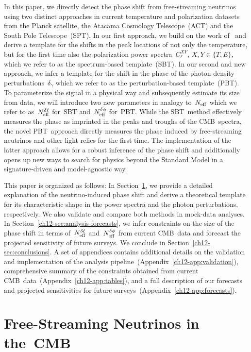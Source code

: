 In this paper, we directly detect the phase shift from free-streaming neutrinos using two distinct approaches in current temperature and polarization datasets from the Planck satellite, the Atacama Cosmology Telescope~(ACT) and the South Pole Telescope~(SPT). In our first approach, we build on the work of~\cite{Follin:2015hya} and derive a template for the shifts in the peak locations of not only the temperature, but for the first time also the polarization power spectra~$C_\ell^{XY}$\hskip-2pt, $X,Y \in \{T, E\}$, which we refer to as the spectrum-based template~(SBT). In our second and new approach, we infer a template for the shift in the phase of the photon density perturbations~$\delta_\gamma$ which we refer to as the perturbation-based template~(PBT). To parameterize the signal in a physical way and subsequently estimate its size from data, we will introduce two new parameters in analogy to~$N_\mathrm{eff}$ which we refer to as~$N_\mathrm{eff}^{\delta\ell}$ for~SBT and~$N_\mathrm{eff}^{\delta\phi}$ for~PBT. While the SBT~method effectively measures the phase as imprinted in the peaks and troughs of the CMB~spectra, the novel PBT~approach directly measures the phase induced by free-streaming neutrinos and other light relics for the first time. The implementation of the latter approach allows for a robust inference of the phase shift and additionally opens up new ways to search for physics beyond the Standard Model in a signature-driven and model-agnostic way.\bigskip

This paper is organized as follows: In Section~\ref{ch12-sec:background}, we provide a detailed explanation of the neutrino-induced phase shift and derive a theoretical template for its characteristic shape in the power spectra and the photon perturbations, respectively. We also validate and compare both methods in mock-data analyses. In Section~\ref{ch12-sec:analysis-forecasts}, we infer constraints on the size of the phase shift in terms of~$N_\mathrm{eff}^{\delta\ell}$ and~$N_\mathrm{eff}^{\delta\phi}$ from current CMB~data and forecast the projected sensitivity of future surveys. We conclude in Section~\ref{ch12-sec:conclusions}. A set of appendices contains additional details on the validation and implementation of the analysis pipeline~(Appendix~\ref{ch12-app:validation}), comprehensive summary of the constraints obtained from current CMB~data~(Appendix~\ref{ch12-app:tables}), and a full description of our forecasts and projected sensitivities for future surveys~(Appendix~\ref{ch12-app:forecasts}).




\section{Free-Streaming Neutrinos in the~CMB}
\label{ch12-sec:background}


